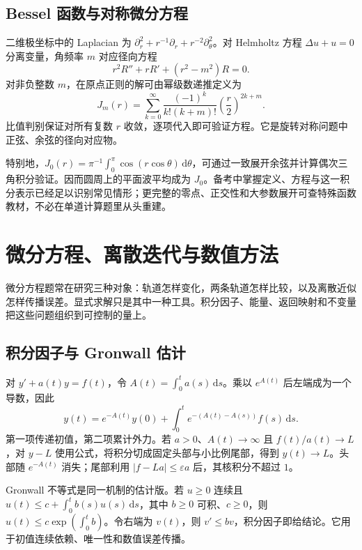 \documentclass[UTF8,12pt,a4paper,fontset=fandol]{ctexart}
\begin{document}
\subsection{Bessel 函数与对称微分方程}

\label{app:special-bessel}

二维极坐标中的 Laplacian 为 $\partial_r^2+r^{-1}\partial_r+r^{-2}\partial_\theta^2$。对 Helmholtz 方程 $\Delta u+u=0$ 分离变量，角频率 $m$ 对应径向方程
\[
r^2R''+rR'+(r^2-m^2)R=0.
\]
对非负整数 $m$，在原点正则的解可由幂级数递推定义为
\[
J_m(r)=\sum_{k=0}^\infty\frac{(-1)^k}{k!(k+m)!}\left(\frac r2\right)^{2k+m}.
\]
比值判别保证对所有复数 $r$ 收敛，逐项代入即可验证方程。它是旋转对称问题中正弦、余弦的径向对应物。

特别地，$J_0(r)=\pi^{-1}\int_0^\pi\cos(r\cos\theta)\,\mathrm d\theta$，可通过一致展开余弦并计算偶次三角积分验证。因而圆周上的平面波平均成为 $J_0$。备考中掌握定义、方程与这一积分表示已经足以识别常见情形；更完整的零点、正交性和大参数展开可查特殊函数教材，不必在单道计算题里从头重建。



\section{微分方程、离散迭代与数值方法}

微分方程题常在研究三种对象：轨道怎样变化，两条轨道怎样比较，以及离散近似怎样传播误差。显式求解只是其中一种工具。积分因子、能量、返回映射和不变量把这些问题组织到可控制的量上。

\subsection{积分因子与 Gronwall 估计}

\label{app:dynamics-factor}

对 $y'+a(t)y=f(t)$，令 $A(t)=\int_0^ta(s)\,\mathrm ds$。乘以 $e^{A(t)}$ 后左端成为一个导数，因此
\[
y(t)=e^{-A(t)}y(0)+\int_0^te^{-(A(t)-A(s))}f(s)\,\mathrm ds.
\]
第一项传递初值，第二项累计外力。若 $a>0$、$A(t)\to\infty$ 且 $f(t)/a(t)\to L$，对 $y-L$ 使用公式，将积分切成固定头部与小比例尾部，得到 $y(t)\to L$。头部随 $e^{-A(t)}$ 消失；尾部利用 $|f-La|\leq\varepsilon a$ 后，其核积分不超过 $1$。

Gronwall 不等式是同一机制的估计版。若 $u\geq0$ 连续且 $u(t)\leq c+\int_0^tb(s)u(s)\,\mathrm ds$，其中 $b\geq0$ 可积、$c\geq0$，则 $u(t)\leq c\exp(\int_0^tb)$。令右端为 $v(t)$，则 $v'\leq bv$，积分因子即给结论。它用于初值连续依赖、唯一性和数值误差传播。
\end{document}
